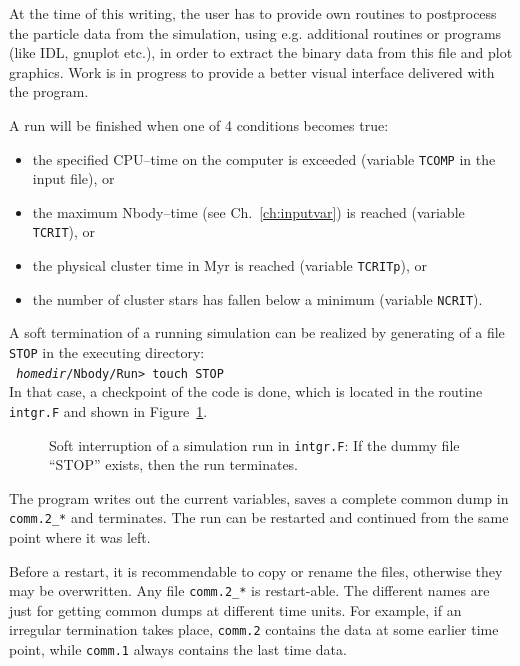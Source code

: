 At the time of this writing, the user has to provide own routines
to postprocess the particle data from the simulation, using
e.g. additional routines or programs (like IDL, gnuplot etc.),
in order to extract the binary data from this file and plot
graphics.
Work is in progress to provide a better visual interface delivered
with the program.

A run will be finished when one of 4 conditions becomes true:
\begin{itemize}
\item the specified CPU--time on the computer is exceeded
      (variable {\tt TCOMP} in the input file), or
\item the maximum Nbody--time (see Ch.~\ref{ch:inputvar}) is reached
      (variable {\tt TCRIT}), or
\item the physical cluster time in Myr is reached (variable
      {\tt TCRITp}), or
\item the number of cluster stars has fallen below a minimum
      (variable {\tt NCRIT}).
\end{itemize}
%
A soft termination of a running simulation can be realized by
generating of a file {\tt STOP} in the executing directory:\\

\noindent
{\tt
  {\it homedir}/Nbody/Run> touch STOP
}\\

\noindent
In that case, a checkpoint of the code is done,
which is located in the routine {\tt intgr.F} and
shown in Figure~\ref{fig:integrF}.
%
\begin{figure}[bh]
  \centering
  \caption{Soft interruption of a simulation run in {\tt intgr.F}:
           If the dummy file ``STOP'' exists, then the run terminates.}
  \label{fig:integrF}
\end{figure}
%
The program writes out the current variables, saves a complete common
dump in {\tt comm.2\_*} and terminates.
The run can be restarted and continued from the same point where it
was left.

Before a restart, it is recommendable to copy or rename the files,
otherwise they may be overwritten.
Any file {\tt comm.2\_*} is restart-able.
The different names are just for getting common dumps at different
time units.
For example, if an irregular termination takes place, {\tt comm.2}
contains the data at some earlier time point, while {\tt comm.1}
always contains the last time data.

